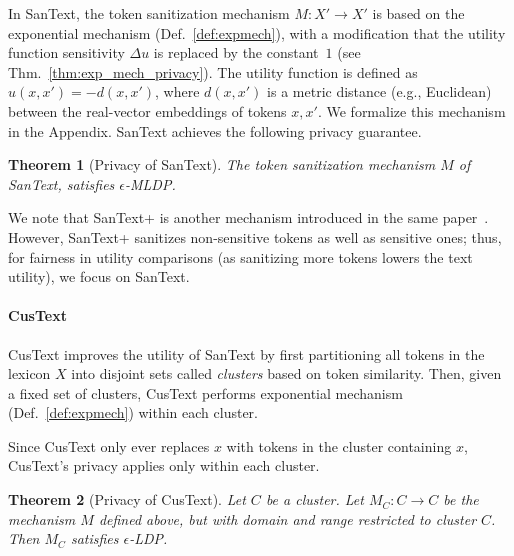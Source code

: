 \documentclass[11pt]{article}
\newtheorem{theorem}{Theorem}
\newtheorem{corollary}{Corollary}
\begin{document}
In SanText,
the token sanitization mechanism $M:X' \rightarrow X'$ is  based on the exponential mechanism (Def.~\ref{def:expmech}), with a modification that the utility function sensitivity \( \Delta u \) is replaced by the constant~\( 1 \) (see Thm.~\ref{thm:exp_mech_privacy}). The utility function is defined as $u(x, x') = -d(x, x')$, where $d(x, x')$ is a metric distance (e.g., Euclidean) between the real-vector embeddings of tokens $x, x'$. We formalize this mechanism in the Appendix.
SanText achieves the following privacy guarantee.

\begin{theorem}[Privacy of SanText]
    The token sanitization mechanism \( M \) of SanText, satisfies \( \epsilon \)-MLDP.
\end{theorem}


We note that SanText+ is another mechanism introduced in the same paper~\cite{yue2021differential}. However, SanText+ sanitizes non-sensitive tokens as well as sensitive ones; thus, for fairness in utility comparisons (as sanitizing more tokens lowers the text utility), we focus on SanText. 

\paragraph{CusText~\cite{chen2023customized}}
\label{sec:custext}

CusText improves the utility of SanText by first partitioning all tokens in the lexicon $X$ into disjoint sets called {\em clusters} based on token similarity. 
Then, given a fixed set of clusters, CusText performs exponential mechanism (Def.~\ref{def:expmech}) within each cluster. 


Since CusText only ever replaces $x$ with tokens in the cluster containing $x$, CusText's privacy applies only within each cluster. 

\begin{theorem}[Privacy of CusText]
Let $C$ be a cluster. 
Let $M_{C}:C \rightarrow C$ be the mechanism $M$ defined above, but with domain and range restricted to cluster $C$. Then $M_{C}$ satisfies $\epsilon$-LDP.
\end{theorem}
\end{document}
